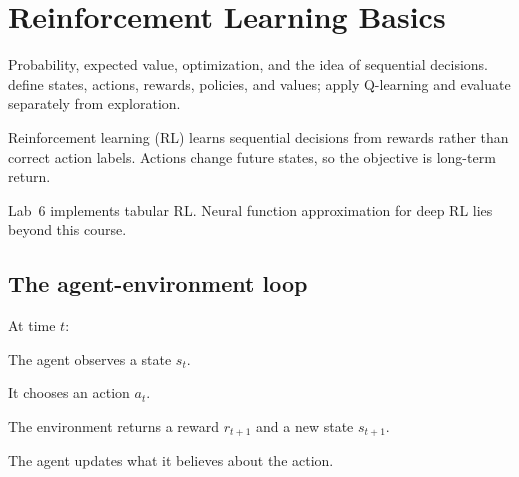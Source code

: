 \chapter{Reinforcement Learning Basics}
\label{ch:rl}

\chapterguide%
  {Probability, expected value, optimization, and the idea of sequential decisions.}
  {define states, actions, rewards, policies, and values; apply Q-learning and evaluate separately from exploration.}

Reinforcement learning (RL) learns sequential decisions from rewards rather than correct action labels. Actions change future states, so the objective is long-term return.

\begin{coursechoice}
Lab~6 implements tabular RL. Neural function approximation for deep RL lies beyond this course.
\end{coursechoice}

\section{The agent-environment loop}

At time $t$:

\begin{mlsteps}
  \item The agent observes a state $s_t$.
  \item It chooses an action $a_t$.
  \item The environment returns a reward $r_{t+1}$ and a new state $s_{t+1}$.
  \item The agent updates what it believes about the action.
\end{mlsteps}

\begin{mlfigure}
\end{mlfigure}

